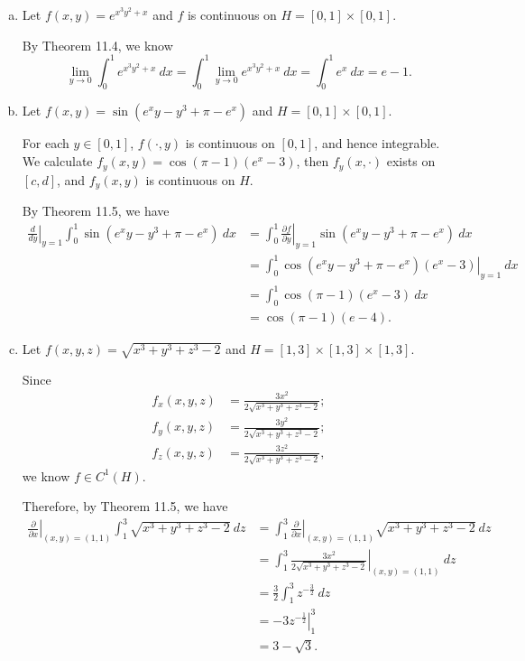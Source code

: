 \begin{Exercise}
\begin{enumerate}[a)]
\item
\begin{solution}
Let $f(x,y) = e^{x^3y^2+x}$ and $f$ is continuous on $H=[0,1]\times[0,1]$. 

By Theorem 11.4, we know
$$
\lim_{y\to 0}\int_{0}^{1} e^{x^3y^2+x}\ dx
= \int_{0}^{1} \lim_{y\to 0} e^{x^3y^2+x}\ dx
= \int_{0}^{1} e^x\ dx
= e-1.
$$
\end{solution}

\item
\begin{solution}
Let $f(x,y) = \sin(e^x y-y^3+\pi-e^x)$ and $H = [0,1]\times[0,1]$.

For each $y\in[0,1]$, $f(\cdot,y)$ is continuous on $[0,1]$, and hence integrable.
We calculate $f_y(x,y) = \cos(\pi-1)(e^x-3)$, then $f_y(x,\cdot)$ exists on $[c,d]$, and $f_y(x,y)$ is continuous on $H$.

By Theorem 11.5, we have
\begin{align*}
\left. \frac{d}{dy} \right|_{y=1}\int_{0}^{1} \sin(e^x y-y^3+\pi-e^x)\ dx
&= \int_{0}^{1} \left. \frac{\partial f}{\partial y} \right|_{y=1} \sin(e^x y-y^3+\pi-e^x)\ dx \\
&= \int_{0}^{1} \left. \cos(e^x y-y^3+\pi-e^x)(e^x-3) \right|_{y=1} \ dx \\
&= \int_{0}^{1} \cos(\pi-1)(e^x-3)\ dx \\
&= \cos(\pi-1)(e-4).
\end{align*}
\end{solution}

\item
\begin{solution}
Let $f(x,y,z)=\sqrt{x^3+y^3+z^3-2}$ and $H = [1,3]\times[1,3]\times[1,3]$.

Since
\begin{align*}
f_x(x,y,z) &= \frac{3x^2}{2\sqrt{x^3+y^3+z^3-2}}; \\
f_y(x,y,z) &= \frac{3y^2}{2\sqrt{x^3+y^3+z^3-2}}; \\
f_z(x,y,z) &= \frac{3z^2}{2\sqrt{x^3+y^3+z^3-2}},
\end{align*}
we know $f\in C^{1}(H)$.

Therefore, by Theorem 11.5, we have
\begin{align*}
\left. \frac{\partial}{\partial x} \right|_{(x,y)=(1,1)} \int_{1}^{3} \sqrt{x^3+y^3+z^3-2}\ dz
&= \int_{1}^{3} \left. \frac{\partial}{\partial x}\right|_{(x,y)=(1,1)}\sqrt{x^3+y^3+z^3-2}\ dz \\
&= \int_{1}^{3} \left. \frac{3x^2}{2\sqrt{x^3+y^3+z^3-2} } \right|_{(x,y)=(1,1)}\ dz \\
&= \frac{3}{2} \int_{1}^{3} z^{-\frac{3}{2}}\ dz \\
&= -3 \left. z^{-\frac{1}{2}} \right|_{1}^{3} \\
&= 3-\sqrt{3}.
\end{align*}
\end{solution}
\end{enumerate}
\end{Exercise}